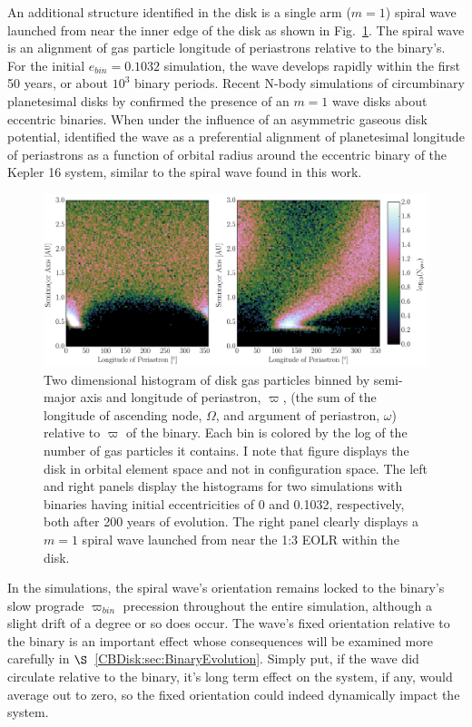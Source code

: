 An additional structure identified in the disk is a single arm ($m = 1$) spiral wave launched from near the inner edge of the disk as shown
in Fig.~\ref{fig:CBDiskDiskWave}.  The spiral wave is an alignment of gas particle longitude of periastrons relative to the binary's.  For the initial $e_{bin} = 0.1032$ simulation, the wave develops rapidly within the first 50 years, or about $10^3$ binary periods.  Recent N-body simulations of circumbinary planetesimal disks by \citet{Lines2016} confirmed the presence of an $m = 1$ wave disks about eccentric binaries.  When under the influence of an asymmetric gaseous disk potential, \citet{Lines2016} identified the wave as a preferential alignment of planetesimal longitude of periastrons as a function of orbital radius around the eccentric binary of the Kepler 16 system, similar to the spiral wave found in this work.

\begin{figure}
	\includegraphics[width=\textwidth]{f5}
    \caption{Two dimensional histogram of disk gas particles binned by semi-major axis and
longitude of periastron, $\varpi$, (the sum of the longitude of ascending node, $\Omega$, and argument of periastron, $\omega$)
relative to $\varpi$ of the binary.  Each bin is colored by the log of the number of gas particles it contains.  I note that figure displays the disk in orbital element 
space and not in configuration space.  The left and right panels display the histograms for two simulations with binaries having initial eccentricities of 0 and 
0.1032, respectively, both after 200 years of evolution.  The right panel clearly displays a $m = 1$ spiral wave launched from near the 1:3 EOLR within the disk.}
    \label{fig:CBDiskDiskWave}
\end{figure}

In the simulations, the spiral wave's orientation remains locked to
the binary's slow prograde $\varpi_{bin}$ precession throughout the
entire simulation, although a slight drift of a degree or so does
occur.  The wave's fixed orientation relative to the binary is an
important effect whose consequences will be examined more carefully in
$\S$~\ref{CBDisk:sec:BinaryEvolution}.  Simply put, if the wave did circulate
relative to the binary, it's long term effect on the system, if any,
would average out to zero, so the fixed orientation could indeed dynamically impact the system.

